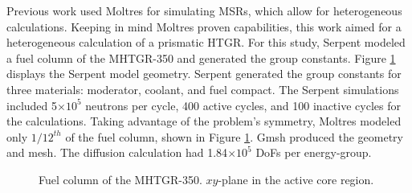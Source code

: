 Previous work \cite{lindsay_introduction_2018}\cite{pater_multiphysics_2019} used Moltres for simulating \glspl{MSR}, which allow for heterogeneous calculations.
Keeping in mind Moltres proven capabilities, this work aimed for a heterogeneous calculation of a prismatic \gls{HTGR}.
For this study, Serpent modeled a fuel column of the MHTGR-350 and generated the group constants.
Figure \ref{fig:fuelcolumn} displays the Serpent model geometry.
Serpent generated the group constants for three materials: moderator, coolant, and fuel compact.
The Serpent simulations included 5$\times 10^5$ neutrons per cycle, 400 active cycles, and 100 inactive cycles for the calculations.
Taking advantage of the problem's symmetry, Moltres modeled only $1/12^{th}$ of the fuel column, shown in Figure \ref{fig:fuelcolumn}.
Gmsh \cite{geuzaine_gmsh_2009} produced the geometry and mesh.
The diffusion calculation had 1.84$\times 10^5$ \glspl{DoF} per energy-group.

\begin{figure}[htbp!]
	\centering
	\hfill
    \caption{Fuel column of the MHTGR-350. $xy$-plane in the active core region.}
	\label{fig:fuelcolumn}
\end{figure}

